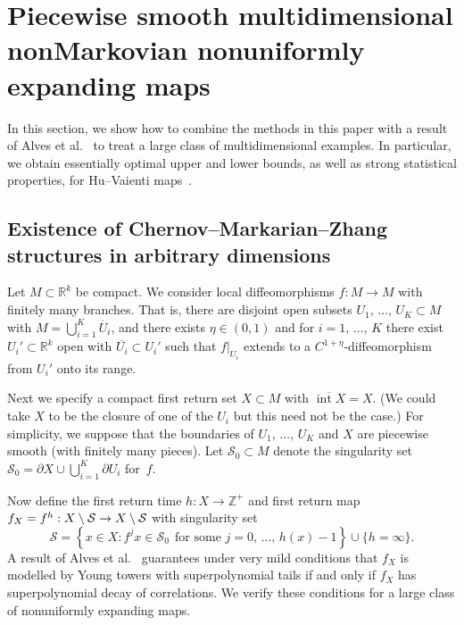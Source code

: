 \documentclass[10pt]{amsart}
\theoremstyle{definition}\newtheorem{defi}[theo]{Definition}\newtheorem{rema}[theo]{Remark}\newtheorem{exam}[theo]{Example}\newtheorem{exem}[theo]{Example}\newtheorem{nota}[theo]{Notation}
\newcommand{\R}{\mathbb{R}}
\newcommand{\Z}{\mathbb{Z}}
\newcommand{\cS}{\mathcal{S}}
\DeclareMathOperator{\Int}{int}
\begin{document}
\section{Piecewise smooth multidimensional nonMarkovian nonuniformly expanding maps}\label{sec:NUE}

In this section, we show how to combine the methods in this paper with a result of Alves et al.~\cite{AFLV11} to treat a large class of multidimensional examples. In particular, we obtain essentially optimal upper and lower bounds, as well as strong statistical properties, for Hu--Vaienti maps~\cite{HuVaienti09}.

\subsection{Existence of Chernov--Markarian--Zhang structures in arbitrary dimensions}\label{sec:piecewise}

Let $M\subset\R^k$ be compact. We consider local diffeomorphisms $f:M\to M$ with finitely many branches. That is, there are disjoint open subsets $U_1,\,\dots,\,U_K\subset M$ with $M=\bigcup_{i=1}^K \overline{U}_i$, and there exists $\eta\in(0,1)$ and for $i=1,\,\dots,\,K$ there exist $U_i'\subset \R^k$ open with $\overline{U_i}\subset U_i'$ such that $f|_{U_i}$ extends to a $C^{1+\eta}$-diffeomorphism from $U_i'$ onto its range.

Next we specify a compact first return set $X\subset M$ with $\overline{\Int X}=X$. (We could take $X$ to be the closure of one of the $U_i$ but this need not be the case.) For simplicity, we suppose that the boundaries of $U_1,\,\dots,\,U_K$ and $X$ are piecewise smooth (with finitely many pieces). Let $\cS_0\subset M$ denote the singularity set $\cS_0=\partial X\cup\bigcup_{i=1}^K\partial U_i$ for~$f$.

Now define the first return time $h:X\to\Z^+$ and first return map $f_X\linebreak=f^h:X\setminus\cS\to X\setminus\cS$ with singularity set
\[
\cS=\left\{x\in X:f^jx\in\cS_0\;\,\text{for some }j=0,\,\dots,\,h(x)-1\right\}\cup \{h=\infty\}.
\]
A result of Alves et al.~\cite{AFLV11} guarantees under very mild conditions that $f_X$ is modelled by Young towers with superpolynomial tails if and only if $f_X$ has superpolynomial decay of correlations. We verify these conditions for a large class of nonuniformly expanding maps.
\end{document}
